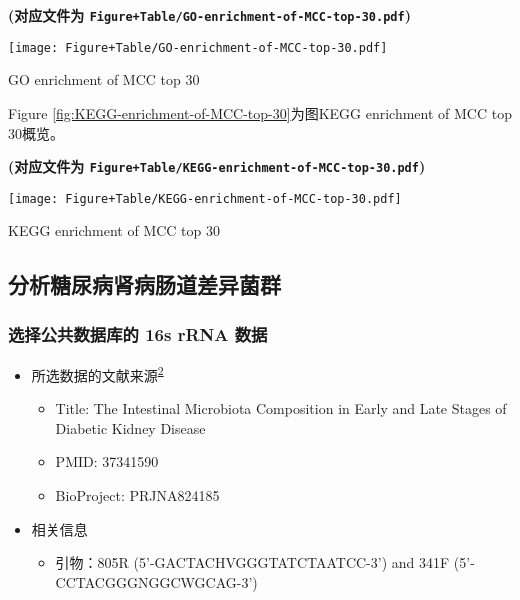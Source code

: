 \documentclass[
]{article}
\providecommand{\tightlist}{%
  \setlength{\itemsep}{0pt}\setlength{\parskip}{0pt}}
\begin{document}
\textbf{(对应文件为 \texttt{Figure+Table/GO-enrichment-of-MCC-top-30.pdf})}

\def\@captype{figure}
\begin{center}
\texttt{[image: Figure+Table/GO-enrichment-of-MCC-top-30.pdf]}
\caption{GO enrichment of MCC top 30}\label{fig:GO-enrichment-of-MCC-top-30}
\end{center}

Figure \ref{fig:KEGG-enrichment-of-MCC-top-30}为图KEGG enrichment of MCC top 30概览。

\textbf{(对应文件为 \texttt{Figure+Table/KEGG-enrichment-of-MCC-top-30.pdf})}

\def\@captype{figure}
\begin{center}
\texttt{[image: Figure+Table/KEGG-enrichment-of-MCC-top-30.pdf]}
\caption{KEGG enrichment of MCC top 30}\label{fig:KEGG-enrichment-of-MCC-top-30}
\end{center}

\hypertarget{ux5206ux6790ux7cd6ux5c3fux75c5ux80beux75c5ux80a0ux9053ux5deeux5f02ux83ccux7fa4}{%
\subsection{分析糖尿病肾病肠道差异菌群}\label{ux5206ux6790ux7cd6ux5c3fux75c5ux80beux75c5ux80a0ux9053ux5deeux5f02ux83ccux7fa4}}

\hypertarget{ux9009ux62e9ux516cux5171ux6570ux636eux5e93ux7684-16s-rrna-ux6570ux636e}{%
\subsubsection{选择公共数据库的 16s rRNA 数据}\label{ux9009ux62e9ux516cux5171ux6570ux636eux5e93ux7684-16s-rrna-ux6570ux636e}}

\begin{itemize}
\tightlist
\item
  所选数据的文献来源\textsuperscript{\protect\hyperlink{ref-TheIntestinalZhang2023}{2}}

  \begin{itemize}
  \tightlist
  \item
    Title: The Intestinal Microbiota Composition in Early and Late Stages of Diabetic Kidney Disease
  \item
    PMID: 37341590
  \item
    BioProject: PRJNA824185
  \end{itemize}
\item
  相关信息

  \begin{itemize}
  \tightlist
  \item
    引物：805R (5'-GACTACHVGGGTATCTAATCC-3') and 341F (5'-CCTACGGGNGGCWGCAG-3')
  \end{itemize}
\end{itemize}
\end{document}

